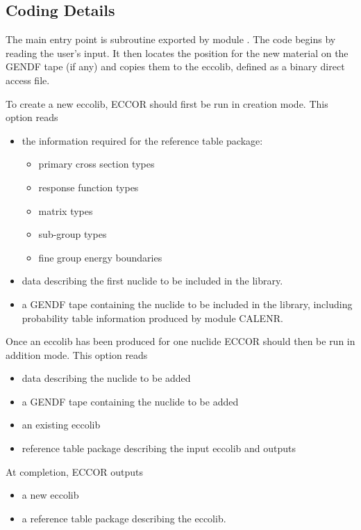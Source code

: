 \subsection{Coding Details}
\label{ssECCOR_details}

The main entry point is subroutine  exported by
module .
The code begins by reading the user's input. It then locates the
position for the new material on the GENDF
tape (if any) and copies them to the eccolib, defined as a binary
direct access file.

To create a new eccolib, ECCOR should first be run in creation
mode.
This option reads
\begin{itemize}
\item the information required for the reference table package:
\begin{itemize}
  \item primary cross section types
  \item response function types
  \item matrix types
  \item sub-group types
  \item fine group energy boundaries
\end{itemize}
\item data describing the first nuclide to be included in the library.
\item a GENDF tape containing the nuclide to be included in the library,
including probability table information produced by module CALENR.
\end{itemize}

Once an eccolib has been produced for one nuclide ECCOR should then be
run in addition mode. This option reads
\begin{itemize}
  \item data describing the nuclide to be added
  \item a GENDF tape containing the nuclide to be added
  \item an existing eccolib
  \item reference table package describing the input eccolib and outputs
\end{itemize}

At completion, ECCOR outputs
\begin{itemize}
  \item a new eccolib
  \item a reference table package describing the eccolib.
\end{itemize}

\cleardoublepage
